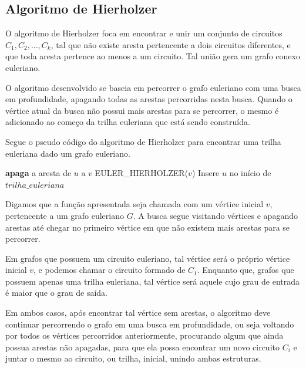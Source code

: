 

\subsection{Algoritmo de Hierholzer}

O algoritmo de Hierholzer foca em encontrar e unir um conjunto de circuitos $C_1, C_2, \dots, C_k$, tal que não existe aresta pertencente a dois circuitos diferentes, e que toda aresta pertence ao menos a um circuito.
Tal união gera um grafo conexo euleriano.

O algoritmo desenvolvido se baseia em percorrer o grafo euleriano com uma busca em profundidade, apagando todas as arestas percorridas nesta busca.
Quando o vértice atual da busca não possui mais arestas para se percorrer, o mesmo é adicionado ao começo da trilha euleriana que está sendo construída.

Segue o pseudo código do algoritmo de Hierholzer para encontrar uma trilha euleriana dado um grafo euleriano.

\begin{algorithmic}[1]
    \State \textbf{apaga} a aresta de $u$ a $v$
    \State EULER\_HIERHOLZER($v$)
\EndFor
\State Insere $u$ no início de $trilha\_euleriana$
\EndFunction
\end{algorithmic}

Digamos que a função apresentada seja chamada com um vértice inicial $v$, pertencente a um grafo euleriano $G$. A busca segue visitando vértices e apagando arestas até chegar no primeiro vértice em que não existem mais arestas para se percorrer. 

Em grafos que possuem um circuito euleriano, tal vértice será o próprio vértice inicial $v$, e podemos chamar o circuito formado de $C_1$.
Enquanto que, grafos que possuem apenas uma trilha euleriana, tal vértice será aquele cujo grau de entrada é maior que o grau de saída.

Em ambos casos, após encontrar tal vértice sem arestas, o algoritmo deve continuar percorrendo o grafo em uma busca em profundidade, ou seja voltando por todos os vértices percorridos anteriormente, procurando algum que ainda possua arestas não apagadas, para que ela possa encontrar um novo circuito $C_i$ e juntar o mesmo ao circuito, ou trilha, inicial, unindo ambas estruturas. 

